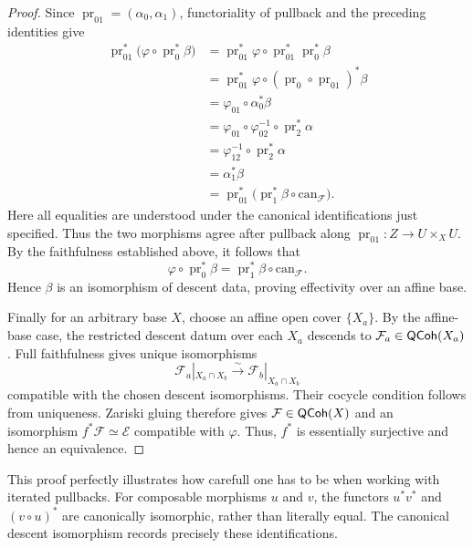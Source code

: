 \begin{proof}
	Since
	$\operatorname{pr}_{01}=(\alpha_0,\alpha_1)$,
	functoriality of pullback and the preceding identities
	give
	\[
	\begin{aligned}
		\operatorname{pr}_{01}^*
		\bigl(\varphi\circ\operatorname{pr}_0^*\beta\bigr)
		&=
		\operatorname{pr}_{01}^*\varphi
		\circ\operatorname{pr}_{01}^*\operatorname{pr}_0^*\beta\\
		&=
		\operatorname{pr}_{01}^*\varphi
		\circ(\operatorname{pr}_0\circ
		\operatorname{pr}_{01})^*\beta\\
		&=\varphi_{01}\circ\alpha_0^*\beta\\
		&=\varphi_{01}\circ\varphi_{02}^{-1}
		\circ\operatorname{pr}_2^*\alpha\\
		&=\varphi_{12}^{-1}\circ\operatorname{pr}_2^*\alpha\\
		&=\alpha_1^*\beta\\
		&=
		\operatorname{pr}_{01}^*
		\bigl(\operatorname{pr}_1^*\beta
		\circ\mathrm{can}_{\mathcal{F}}\bigr).
	\end{aligned}
	\]
	Here all equalities are understood under the canonical
	identifications just specified.
	Thus the two morphisms agree after pullback along
	$\operatorname{pr}_{01}:Z\to U\times_X U$.
	By the faithfulness established above, it follows that
	\[
	\varphi\circ\operatorname{pr}_0^*\beta
	=
	\operatorname{pr}_1^*\beta\circ\mathrm{can}_{\mathcal{F}}.
	\]
	Hence $\beta$ is an isomorphism of descent data, proving
	effectivity over an affine base.
	
	
	
	
	Finally for an arbitrary base $X$, choose an affine open cover $\{X_a\}$.
	By the affine-base case, the restricted descent datum
	over each $X_a$ descends to
	$\mathcal{F}_a\in\mathsf{QCoh}(X_a)$.
	Full faithfulness gives unique isomorphisms
	\[
	\mathcal{F}_a|_{X_a\cap X_b}
	\xrightarrow{\sim}
	\mathcal{F}_b|_{X_a\cap X_b}
	\]
	compatible with the chosen descent isomorphisms.
	Their cocycle condition follows from uniqueness.
	Zariski gluing therefore gives
	$\mathcal{F}\in\mathsf{QCoh}(X)$ and an isomorphism
	$f^*\mathcal{F}\simeq\mathcal{E}$ compatible with
	$\varphi$.
	Thus, $f^*$ is essentially surjective and hence
	an equivalence.
\end{proof}

\begin{remark}
	This proof perfectly illustrates how carefull one has to be when working
	with iterated pullbacks.
	For composable morphisms $u$ and $v$, the functors
	$u^*v^*$ and $(v\circ u)^*$ are canonically isomorphic,
	rather than literally equal.
	The canonical descent isomorphism records precisely
	these identifications.
\end{remark}